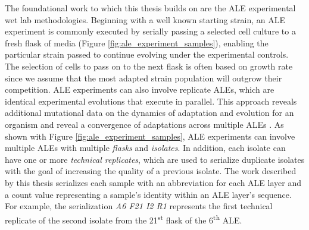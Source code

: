 \documentclass[12pt,final,masters,chapterheads]{ucsd}  %
\begin{document}
%
%
The foundational work to which this thesis builds on are the ALE experimental wet lab methodologies. Beginning with a well known starting strain, an ALE experiment is commonly executed by serially passing a selected cell culture to a fresh flask of media (Figure \ref{fig:ale_experiment_samples}), enabling the particular strain passed to continue evolving under the experimental controls. The selection of cells to pass on to the next flask is often based on growth rate since we assume that the most adapted strain population will outgrow their competition. ALE experiments can also involve replicate ALEs, which are identical experimental evolutions that execute in parallel. This approach reveals additional mutational data on the dynamics of adaptation and evolution for an organism and reveal a convergence of adaptations across multiple ALEs \cite{sys_bio_book}. As shown with Figure \ref{fig:ale_experiment_samples}, ALE experiments can involve multiple ALEs with multiple \textit{flasks} and \textit{isolates}. In addition, each isolate can have one or more \textit{technical replicates}, which are used to serialize duplicate isolates with the goal of increasing the quality of a previous isolate. The work described by this thesis serializes each sample with an abbreviation for each ALE layer and a count value representing a sample's identity within an ALE layer's sequence. For example, the serialization \textit{A6 F21 I2 R1} represents the first technical replicate of the second isolate from the 21\textsuperscript{st} flask of the 6\textsuperscript{th} ALE.
\end{document}
